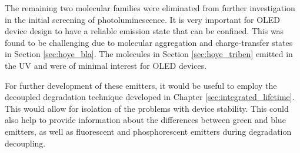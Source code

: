 \documentclass[../thesis.tex]{subfiles}
\begin{document}
The remaining two molecular families were eliminated from further investigation in the initial screening of photoluminescence.
It is very important for OLED device design to have a reliable emission state that can be confined.  
This was found to be challenging due to molecular aggregation and charge-transfer states in Section \ref{sec:hoye_bla}.
The molecules in Section \ref{sec:hoye_triben} emitted in the UV and were of minimal interest for OLED devices.

For further development of these emitters, it would be useful to employ the decoupled degradation technique developed in Chapter \ref{sec:integrated_lifetime}.
This would allow for isolation of the problems with device stability.
This could also help to provide information about the differences between green and blue emitters, as well as fluorescent and phosphorescent emitters during degradation decoupling.


\end{document}
